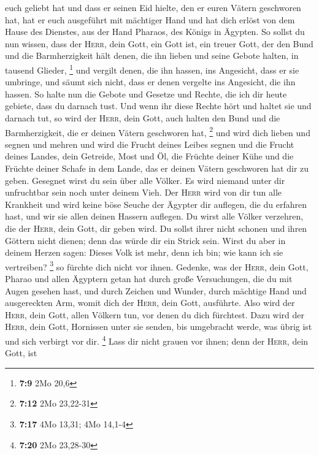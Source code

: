 euch geliebt hat und dass er seinen Eid hielte, den er euren Vätern
geschworen hat, hat er euch ausgeführt mit mächtiger Hand und hat dich
erlöst von dem Hause des Dienstes, aus der Hand Pharaos, des Königs in
Ägypten.  So sollst du nun wissen, dass der \textsc{Herr},
dein Gott, ein Gott ist, ein treuer Gott, der den Bund und die
Barmherzigkeit hält denen, die ihn lieben und seine Gebote halten, in
tausend Glieder, \footnote{\textbf{7:9} 2Mo 20,6}  und
vergilt denen, die ihn hassen, ins Angesicht, dass er sie umbringe, und
säumt sich nicht, dass er denen vergelte ins Angesicht, die ihn hassen.
 So halte nun die Gebote und Gesetze und Rechte, die ich
dir heute gebiete, dass du darnach tust.  Und wenn ihr
diese Rechte hört und haltet sie und darnach tut, so wird der
\textsc{Herr}, dein Gott, auch halten den Bund und die Barmherzigkeit,
die er deinen Vätern geschworen hat, \footnote{\textbf{7:12} 2Mo
  23,22-31}  und wird dich lieben und segnen und mehren
und wird die Frucht deines Leibes segnen und die Frucht deines Landes,
dein Getreide, Most und Öl, die Früchte deiner Kühe und die Früchte
deiner Schafe in dem Lande, das er deinen Vätern geschworen hat dir zu
geben.  Gesegnet wirst du sein über alle Völker. Es wird
niemand unter dir unfruchtbar sein noch unter deinem Vieh.
 Der \textsc{Herr} wird von dir tun alle Krankheit und
wird keine böse Seuche der Ägypter dir auflegen, die du erfahren hast,
und wir sie allen deinen Hassern auflegen.  Du wirst alle
Völker verzehren, die der \textsc{Herr}, dein Gott, dir geben wird. Du
sollst ihrer nicht schonen und ihren Göttern nicht dienen; denn das
würde dir ein Strick sein.  Wirst du aber in deinem
Herzen sagen: Dieses Volk ist mehr, denn ich bin; wie kann ich sie
vertreiben? \footnote{\textbf{7:17} 4Mo 13,31; 4Mo 14,1-4}
 so fürchte dich nicht vor ihnen. Gedenke, was der
\textsc{Herr}, dein Gott, Pharao und allen Ägyptern getan hat
 durch große Versuchungen, die du mit Augen gesehen hast,
und durch Zeichen und Wunder, durch mächtige Hand und ausgereckten Arm,
womit dich der \textsc{Herr}, dein Gott, ausführte. Also wird der
\textsc{Herr}, dein Gott, allen Völkern tun, vor denen du dich
fürchtest.  Dazu wird der \textsc{Herr}, dein Gott,
Hornissen unter sie senden, bis umgebracht werde, was übrig ist und sich
verbirgt vor dir. \footnote{\textbf{7:20} 2Mo 23,28-30} 
Lass dir nicht grauen vor ihnen; denn der \textsc{Herr}, dein Gott, ist
